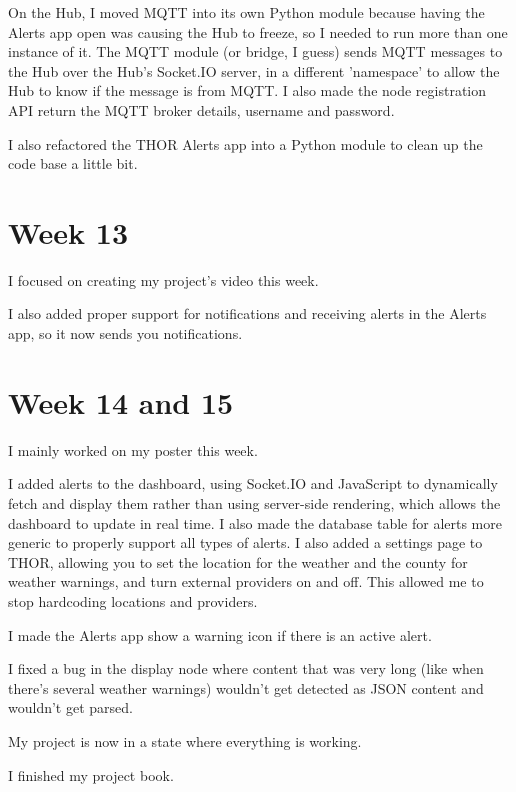 \documentclass{report}
\begin{document}
		On the Hub, I moved MQTT into its own Python module because having the Alerts app open was causing the Hub to freeze, so I needed to run more than one instance of it. The MQTT module (or bridge, I guess) sends MQTT messages to the Hub over the Hub's Socket.IO server, in a different 'namespace' to allow the Hub to know if the message is from MQTT. I also made the node registration API return the MQTT broker details, username and password.
		
		I also refactored the THOR Alerts app into a Python module to clean up the code base a little bit. 
		
		\section{Week 13} %
		I focused on creating my project's video this week.
		
		I also added proper support for notifications and receiving alerts in the Alerts app, so it now sends you notifications.
		
		\section{Week 14 and 15} %
		I mainly worked on my poster this week.
		
		I added alerts to the dashboard, using Socket.IO and JavaScript to dynamically fetch and display them rather than using server-side rendering, which allows the dashboard to update in real time. I also made the database table for alerts more generic to properly support all types of alerts. 
		I also added a settings page to THOR, allowing you to set the location for the weather and the county for weather warnings, and turn external providers on and off. This allowed me to stop hardcoding locations and providers.
		
		I made the Alerts app show a warning icon if there is an active alert.
		
		I fixed a bug in the display node where content that was very long (like when there's several weather warnings) wouldn't get detected as JSON content and wouldn't get parsed.
		
		My project is now in a state where everything is working.
		
		I finished my project book.
	
\end{document}
